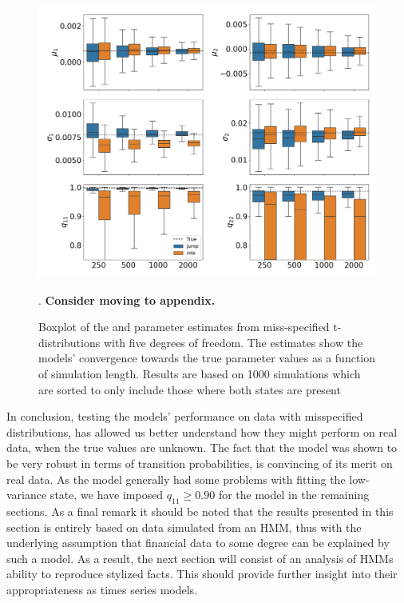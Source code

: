 \begin{figure}[H] 
    \centering
    \includegraphics[width=1\textwidth]{analysis/model_convergence/images/simulation_t_box_2states.png}
    
    
    
    \caption[Boxplot of the \mle and \jump parameter estimates from miss-specified t-distributions with five degrees of freedom. Sorted version]{Boxplot of the \mle and \jump parameter estimates from miss-specified t-distributions with five degrees of freedom. The estimates show the models' convergence towards the true parameter values as a function of simulation length. Results are based on 1000 simulations which are sorted to only include those where both states are present}. \textbf{Consider moving to appendix.}
    \label{fig:jump_t_box_2states}
\end{figure}

In conclusion, testing the models' performance on data with misspecified distributions, has allowed us better understand how they might perform on real data, when the true values are unknown. The fact that the \jump model was shown to be very robust in terms of transition probabilities, is convincing of its merit on real data. As the \mle model generally had some problems with fitting the low-variance state, we have imposed $q_{11}\geq 0.90$ for the model in the remaining sections. As a final remark it should be noted that the results presented in this section is entirely based on data simulated from an HMM, thus with the underlying assumption that financial data to some degree can be explained by such a model. As a result, the next section will consist of an analysis of HMMs ability to reproduce stylized facts. This should provide further insight into their appropriateness as times series models.